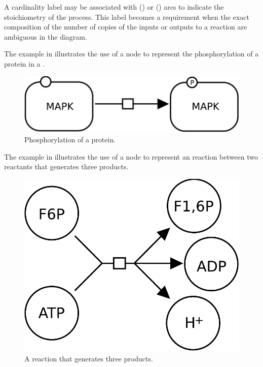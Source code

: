 A cardinality label may be associated with  () or  () arcs to indicate the stoichiometry of the process.  This label becomes a requirement when the exact composition of the number of copies of the inputs or outputs to a reaction are ambiguous in the diagram.

The example in  illustrates the use of a  node to represent the phosphorylation of a protein in a \PD.

\begin{figure}[H]
  \centering
  \includegraphics[scale = 0.3]{examples/transition-phosphorylation}
  \caption{Phosphorylation of a protein.}
  \label{fig:trans-phos}
\end{figure}

The example in  illustrates the use of a  node to represent an reaction between two reactants that generates three products. 

\begin{figure}[H]
  \centering
  \includegraphics[scale = 0.3]{examples/transition-reaction}
  \caption{A reaction that generates three products.}
  \label{fig:trans-react}
\end{figure}

